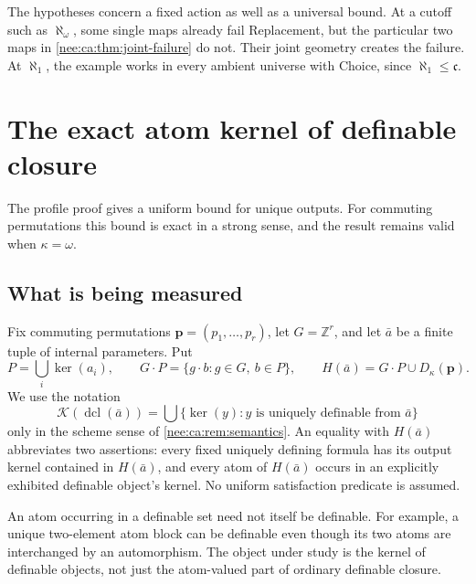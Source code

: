 \documentclass[11pt,letterpaper]{article}
\numberwithin{equation}{section}
\theoremstyle{plain}
\theoremstyle{definition}
\theoremstyle{remark}
\newcommand{\kerat}{\operatorname{ker}}
\newcommand{\cont}{\mathfrak c}
\newcommand{\ZZ}{\mathbb Z}
\newcommand{\dcl}{\operatorname{dcl}}
\begin{document}
The hypotheses concern a fixed action as well as a universal bound. At a cutoff such as $\aleph_\omega$, some single maps already fail Replacement, but the particular two maps in \cref{nee:ca:thm:joint-failure} do not. Their joint geometry creates the failure. At $\aleph_1$, the example works in every ambient universe with Choice, since $\aleph_1\leq\cont$.

\section{The exact atom kernel of definable closure}\label{nee:ca:sec:dcl}

The profile proof gives a uniform bound for unique outputs. For commuting permutations this bound is exact in a strong sense, and the result remains valid when $\kappa=\omega$.

\subsection{What is being measured}

Fix commuting permutations $\boldsymbol p=(p_1,\ldots,p_r)$, let $G=\ZZ^r$, and let $\bar a$ be a finite tuple of internal parameters. Put
\[
P=\bigcup_i\kerat(a_i),\qquad
G\cdot P=\{g\cdot b:g\in G,\ b\in P\},\qquad
H(\bar a)=G\cdot P\cup D_\kappa(\boldsymbol p).
\]
We use the notation
\[
\mathcal K(\dcl(\bar a))
=\bigcup\{\kerat(y):y\text{ is uniquely definable from }\bar a\}
\]
only in the scheme sense of \cref{nee:ca:rem:semantics}. An equality with $H(\bar a)$ abbreviates two assertions: every fixed uniquely defining formula has its output kernel contained in $H(\bar a)$, and every atom of $H(\bar a)$ occurs in an explicitly exhibited definable object's kernel. No uniform satisfaction predicate is assumed.

An atom occurring in a definable set need not itself be definable. For example, a unique two-element atom block can be definable even though its two atoms are interchanged by an automorphism. The object under study is the kernel of definable objects, not just the atom-valued part of ordinary definable closure.
\end{document}
